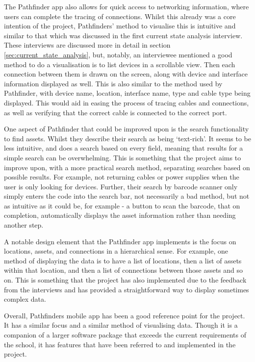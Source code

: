 \documentclass [11pt,a4paper]{article}
\begin{document}
The Pathfinder app also allows for quick access to networking information, where users can complete the tracing of connections. Whilst this already was a core intention of the project, Pathfinders' method to visualise this is intuitive and similar to that which was discussed in the first current state analysis interview. These interviews are discussed more in detail in section \ref{sec:current_state_analysis}, but, notably, an interviewee mentioned a good method to do a visualisation is to list devices in a scrollable view. Then each connection between them is drawn on the screen, along with device and interface information displayed as well. This is also similar to the method used by Pathfinder, with device name, location, interface name, type and cable type being displayed. This would aid in easing the process of tracing cables and connections, as well as verifying that the correct cable is connected to the correct port.

One aspect of Pathfinder that could be improved upon is the search functionality to find assets. Whilst they describe their search as being `text-rich'. It seems to be less intuitive, and does a search based on every field, meaning that results for a simple search can be overwhelming. This is something that the project aims to improve upon, with a more practical search method, separating searches based on possible results. For example, not returning cables or power supplies when the user is only looking for devices. Further, their search by barcode scanner only simply enters the code into the search bar, not necessarily a bad method, but not as intuitive as it could be, for example - a button to scan the barcode, that on completion, automatically displays the asset information rather than needing another step.

A notable design element that the Pathfinder app implements is the focus on locations, assets, and connections in a hierarchical sense. For example, one method of displaying the data is to have a list of locations, then a list of assets within that location, and then a list of connections between those assets and so on. This is something that the project has also implemented due to the feedback from the interviews and has provided a straightforward way to display sometimes complex data.

Overall, Pathfinders mobile app has been a good reference point for the project. It has a similar focus and a similar method of visualising data. Though it is a companion of a larger software package that exceeds the current requirements of the school, it has features that have been referred to and implemented in the project.  
\end{document}
